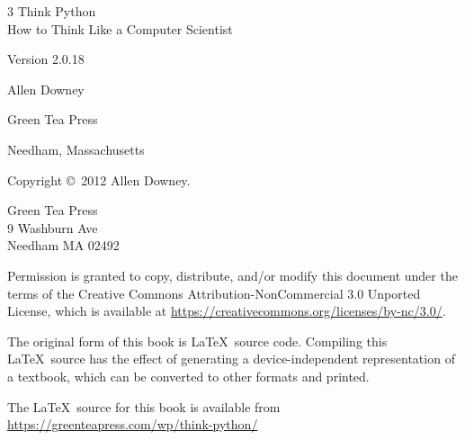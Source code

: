 \documentclass[10pt]{book}
\newcommand{\theversion}{2.0.18}
\newcommand{\thedate}{}
\begin{document}
\begin{latexonly}
\begin{flushright}
\vspace*{2.0in}

\begin{spacing}{3}
{\huge Think Python}\\
{\Large How to Think Like a Computer Scientist}
\end{spacing}

\vspace{0.25in}

Version \theversion

\thedate

\vspace{1in}


{\Large
Allen Downey\\
}


\vspace{0.5in}

{\Large Green Tea Press}

{\small Needham, Massachusetts}

\vfill

\end{flushright}


\pagebreak
\thispagestyle{empty}

{\small
Copyright \copyright ~2012 Allen Downey.


\vspace{0.2in}

\begin{flushleft}
Green Tea Press       \\
9 Washburn Ave        \\
Needham MA 02492
\end{flushleft}

Permission is granted to copy, distribute, and/or modify this document
under the terms of the Creative Commons Attribution-NonCommercial 3.0 Unported
License, which is available at \url{https://creativecommons.org/licenses/by-nc/3.0/}.

The original form of this book is \LaTeX\ source code.  Compiling this
\LaTeX\ source has the effect of generating a device-independent
representation of a textbook, which can be converted to other formats
and printed.

The \LaTeX\ source for this book is available from
\url{https://greenteapress.com/wp/think-python/}

\vspace{0.2in}

} %

\end{latexonly}
\end{document}
